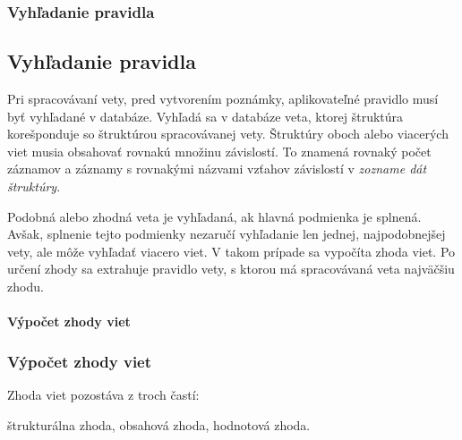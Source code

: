 %
%
{
	\subsubsection{Vyhľadanie pravidla}
}
{
	\subsection{Vyhľadanie pravidla}
}

\label{subsubsection:rule_lookup}
Pri spracovávaní vety, pred vytvorením poznámky, aplikovateľné pravidlo musí byť vyhľadané v databáze. Vyhľadá sa v databáze veta, ktorej štruktúra korešponduje so štruktúrou spracovávanej vety. Štruktúry oboch alebo viacerých viet musia obsahovať rovnakú množinu závislostí. To znamená rovnaký počet záznamov a záznamy s rovnakými názvami vzťahov závislostí v \textit{zozname dát štruktúry}.

Podobná alebo zhodná veta je vyhľadaná, ak hlavná podmienka je splnená. Avšak, splnenie tejto podmienky nezaručí vyhľadanie len jednej, najpodobnejšej vety, ale môže vyhľadať viacero viet. V takom prípade sa vypočíta zhoda viet. Po určení zhody sa extrahuje pravidlo vety, s ktorou má spracovávaná veta najväčšiu zhodu.

%
%
{
	\paragraph{Výpočet zhody viet}
}
{
	\subsubsection{Výpočet zhody viet}
}
\label{paragraph:sentences_match}

Zhoda viet pozostáva z troch častí:
\begin{my_itemize}
	\myitem štrukturálna zhoda,
	\myitem obsahová zhoda,
	\myitem hodnotová zhoda.
\end{my_itemize}

